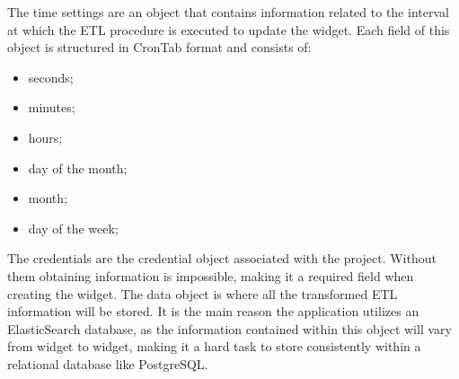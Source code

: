 \documentclass[a4paper,twoside,10pt]{report}
\begin{document}
\newline
The time settings are an object that contains information related to the interval at which the ETL procedure is executed to update the widget. 
\newline
Each field of this object is structured in CronTab format and consists of:
\begin{itemize}
  \item seconds;
  \item minutes;
  \item hours;
  \item day of the month;
  \item month;
  \item day of the week;
\end{itemize}
The credentials are the credential object associated with the project.
\newline
Without them obtaining information is impossible, making it a required field when creating the widget.
\newline
The data object is where all the transformed ETL information will be stored. It is the main reason the application utilizes an ElasticSearch database, as the information contained within this object will vary from widget to widget, making it a hard task to store consistently within a relational database like PostgreSQL.


\newpage
\end{document}
